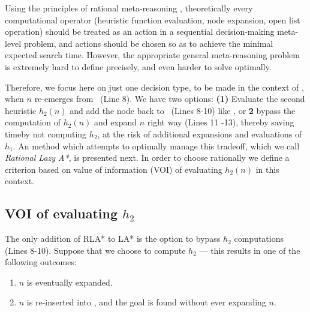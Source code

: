 

Using the principles of rational meta-reasoning \cite{Russell.right},
theoretically every computational operator (heuristic function evaluation, node
expansion, open list operation) should be treated as an action in a sequential
decision-making meta-level problem, and actions should be chosen so as to
achieve the minimal expected search time. However, the appropriate
general meta-reasoning problem is extremely hard to define precisely, and even harder
to solve optimally.

Therefore, we focus here on just one decision type, to be
made in the context of \lazyastar, when $n$ re-emerges from \OPEN~(Line 8).
We have two options: {\bf (1)}  Evaluate the second heuristic $h_2(n)$ and add
the node back to \OPEN~(Lines 8-10) like \lazyastar, or {\bf 2} bypass the
computation of $h_2(n)$ and expand $n$ right way (Lines 11 -13), thereby
saving timeby not computing $h_2$, at the risk of additional expansions and evaluations of $h_1$.
An method which attempts to
optimally manage this tradeoff, which we call \textit{Rational Lazy A*}, is presented next.
In order to choose rationally we define a criterion based on value of
information (VOI) of evaluating $h_2(n)$ in this context.

\subsection{VOI of evaluating $h_2$}

The only addition of RLA* to LA* is the option to bypass $h_2$ computations (Lines 8-10).
Suppose that we choose to compute $h_2$ --- this results in one of the
following outcomes:
\begin{enumerate}
\item $n$ is eventually expanded.
\item $n$ is re-inserted into \OPEN, and the goal is found without ever expanding $n$.
\end{enumerate}

